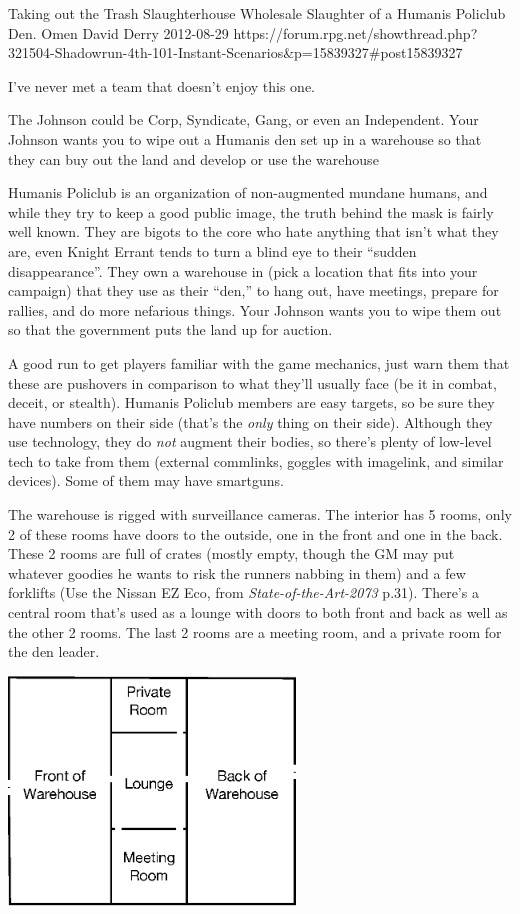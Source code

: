 \begin{scenario}{Taking out the Trash}
	{Slaughterhouse}
	{Wholesale Slaughter of a Humanis Policlub Den.}
	{Omen David Derry}
	{2012-08-29}
	{https://forum.rpg.net/showthread.php?321504-Shadowrun-4th-101-Instant-Scenarios\&p=15839327\#post15839327}

I've never met a team that doesn't enjoy this one.

 The Johnson could be Corp, Syndicate, Gang, or even an Independent. Your Johnson wants you to wipe out a Humanis den set up in a warehouse so that they can buy out the land and develop or use the warehouse

\synopsis Humanis Policlub is an organization of non-augmented mundane humans, and while they try to keep a good public image, the truth behind the mask is fairly well known. They are bigots to the core who hate anything that isn't what they are, even Knight Errant tends to turn a blind eye to their ``sudden disappearance''. They own a warehouse in (pick a location that fits into your campaign) that they use as their ``den,'' to hang out, have meetings, prepare for rallies, and do more nefarious things. Your Johnson wants you to wipe them out so that the government puts the land up for auction.

\notes A good run to get players familiar with the game mechanics, just warn them that these are pushovers in comparison to what they'll usually face (be it in combat, deceit, or stealth). Humanis Policlub members are easy targets, so be sure they have numbers on their side (that's the \textit{only} thing on their side). Although they use technology, they do \textit{not} augment their bodies, so there's plenty of low-level tech to take from them (external commlinks, goggles with imagelink, and similar devices). Some of them may have smartguns.

The warehouse is rigged with surveillance cameras. The interior has 5 rooms, only 2 of these rooms have doors to the outside, one in the front and one in the back. These 2 rooms are full of crates (mostly empty, though the GM may put whatever goodies he wants to risk the runners nabbing in them) and a few forklifts (Use the Nissan EZ Eco, from \textit{State-of-the-Art-2073} p.31). There's a central room that's used as a lounge with doors to both front and back as well as the other 2 rooms. The last 2 rooms are a meeting room, and a private room for the den leader.

\begin{center}
\includegraphics[width=3in]{scenarios/taking-out-the-trash-map}
\end{center}

\end{scenario}
